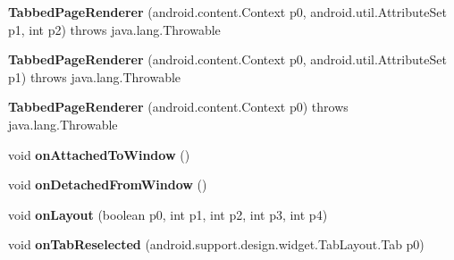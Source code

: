 \begin{DoxyCompactItemize}
\item 
\mbox{\label{classmd5270abb39e60627f0f200893b490a1ade_1_1_tabbed_page_renderer_a29adb24329fe37a1044a6c6e485282a5}} 
{\bfseries Tabbed\+Page\+Renderer} (android.\+content.\+Context p0, android.\+util.\+Attribute\+Set p1, int p2)  throws java.\+lang.\+Throwable 	
\item 
\mbox{\label{classmd5270abb39e60627f0f200893b490a1ade_1_1_tabbed_page_renderer_aa9ac414c6055675bf9eff78fe6f0672e}} 
{\bfseries Tabbed\+Page\+Renderer} (android.\+content.\+Context p0, android.\+util.\+Attribute\+Set p1)  throws java.\+lang.\+Throwable 	
\item 
\mbox{\label{classmd5270abb39e60627f0f200893b490a1ade_1_1_tabbed_page_renderer_aeaaca922e7a247b9e498dce320b2fb99}} 
{\bfseries Tabbed\+Page\+Renderer} (android.\+content.\+Context p0)  throws java.\+lang.\+Throwable 	
\item 
\mbox{\label{classmd5270abb39e60627f0f200893b490a1ade_1_1_tabbed_page_renderer_a2ceb284d7b665527be964c40f6d41f74}} 
void {\bfseries on\+Attached\+To\+Window} ()
\item 
\mbox{\label{classmd5270abb39e60627f0f200893b490a1ade_1_1_tabbed_page_renderer_a2da48a997944fab9d1e33dfbf720a558}} 
void {\bfseries on\+Detached\+From\+Window} ()
\item 
\mbox{\label{classmd5270abb39e60627f0f200893b490a1ade_1_1_tabbed_page_renderer_ac4353b82562a8ecc7822860dd790a58f}} 
void {\bfseries on\+Layout} (boolean p0, int p1, int p2, int p3, int p4)
\item 
\mbox{\label{classmd5270abb39e60627f0f200893b490a1ade_1_1_tabbed_page_renderer_a2f19345d253dcfa7a6ad6abbaf641e8a}} 
void {\bfseries on\+Tab\+Reselected} (android.\+support.\+design.\+widget.\+Tab\+Layout.\+Tab p0)

\end{DoxyCompactItemize}
